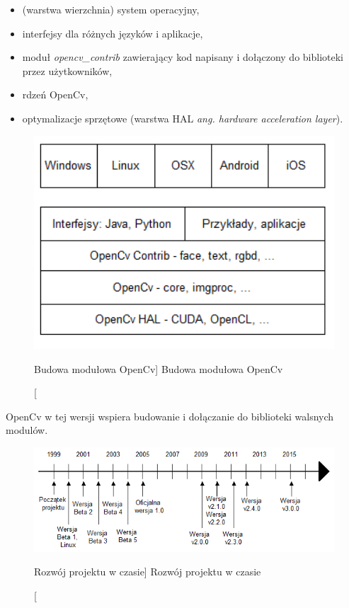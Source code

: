 \documentclass[a4paper,12pt]{article}
\begin{document}
                \begin{spacing}{1}
    				\begin{itemize}
    					\item (warstwa wierzchnia) system operacyjny,
    					\item interfejsy dla różnych języków i aplikacje,
    					\item moduł \textit {opencv\_contrib} zawierający kod napisany i dołączony do biblioteki przez użytkowników,
    					\item rdzeń OpenCv,
    					\item optymalizacje sprzętowe (warstwa HAL \textit {ang. hardware acceleration layer}).
    				\end{itemize} 
                \end{spacing}
            
				\begin{figure}[!ht]  
					\begin{center}
						\includegraphics[width=12cm] {image//openCvBudowa.png} 
					\end{center}
					\caption
					    [Budowa modułowa OpenCv]
					    {Budowa modułowa OpenCv}
				\end{figure}

				\par OpenCv w tej wersji wspiera budowanie i dołączanie do biblioteki walsnych modulów.
	            
				\begin{figure}[!ht]   
					\begin{center}
		    				\includegraphics[width=\linewidth] {image//osCzasu.png} 
					\end{center}
					\caption
					    [Rozwój projektu w czasie]  
					    {Rozwój projektu w czasie}  
				\end{figure}
\end{document}
